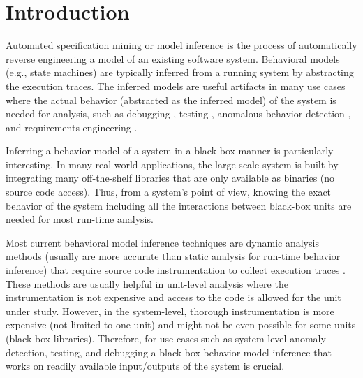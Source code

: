 \section{Introduction}
\label{sec:intro}
Automated specification mining or model inference \cite{lo2011mining} is the process of automatically reverse engineering a model of an existing software system. Behavioral models (e.g., state machines) are typically inferred from a running system by abstracting the execution traces. The inferred models are useful artifacts in many use cases where the actual behavior (abstracted as the inferred model) of the system is needed for analysis, such as debugging \cite{hybriddebugging, shang2013assisting, jafar2019interactive}, testing \cite{Walkinshaw2018TestingBlackBox, ModelBasedTesting, Papadopoulos2015, dallmeier2011automatically}, anomalous behavior detection \cite{valdes2000adaptive}, and requirements engineering \cite{damas2005generating}. 

Inferring a behavior model of a system in a black-box manner is particularly interesting. In many real-world applications, the large-scale system is built by integrating many off-the-shelf libraries that are only available as binaries (no source code access). Thus, from a system's point of view, knowing the exact behavior of the system including all the interactions between black-box units are needed for most run-time analysis. 

Most current behavioral model inference techniques are dynamic analysis methods (usually are more accurate than static analysis for run-time behavior inference) that require source code instrumentation to collect execution traces \cite{lo2011mining}. These methods are usually helpful in unit-level analysis where the instrumentation is not expensive and access to the code is allowed for the unit under study. However, in the system-level, thorough instrumentation is more expensive (not limited to one unit) and might not be even possible for some units (black-box libraries). Therefore, for use cases such as system-level anomaly detection, testing, and debugging a black-box behavior model inference that works on readily available input/outputs of the system is crucial. 


